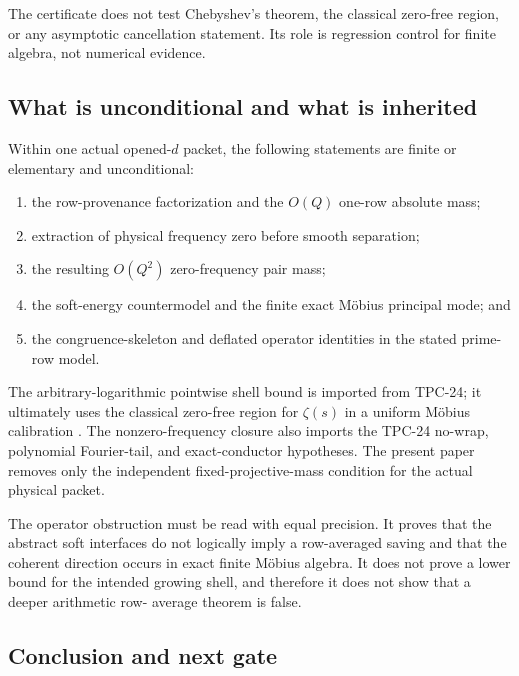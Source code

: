 The certificate does not test Chebyshev's theorem, the classical
zero-free region, or any asymptotic cancellation statement.  Its role
is regression control for finite algebra, not numerical evidence.

\subsection{What is unconditional and what is inherited}

Within one actual opened-\(d\) packet, the following statements are
finite or elementary and unconditional:
\begin{enumerate}[label=\textup{(\roman*)}]
 \item the row-provenance factorization and the \(O(Q)\) one-row
 absolute mass;
 \item extraction of physical frequency zero before smooth separation;
 \item the resulting \(O(Q^2)\) zero-frequency pair mass;
 \item the soft-energy countermodel and the finite exact M\"obius
 principal mode; and
 \item the congruence-skeleton and deflated operator identities in the
 stated prime-row model.
\end{enumerate}
The arbitrary-logarithmic pointwise shell bound is imported from
TPC-24; it ultimately uses the classical zero-free region for
\(\zeta(s)\) in a uniform M\"obius calibration
\citep{WangTPC24,IwaniecKowalski2004}.  The nonzero-frequency closure
also imports the TPC-24 no-wrap, polynomial Fourier-tail, and
exact-conductor hypotheses.  The present paper removes only the
independent fixed-projective-mass condition for the actual physical
packet.

The operator obstruction must be read with equal precision.  It proves
that the abstract soft interfaces do not logically imply a row-averaged
saving and that the coherent direction occurs in exact finite M\"obius
algebra.  It does not prove a lower bound for the intended growing
shell, and therefore it does not show that a deeper arithmetic row-
average theorem is false.

\subsection{Conclusion and next gate}

